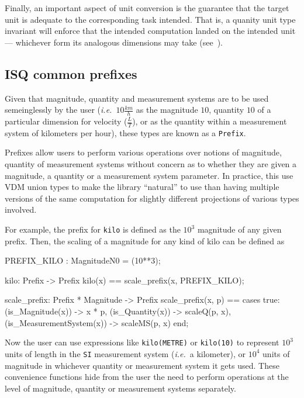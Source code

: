 \documentclass[runningheads,a4paper]{llncs}
\begin{document}
Finally, an important aspect of unit conversion is the guarantee that the target unit is adequate to the corresponding task intended. That is, a quanity unit type invariant will enforce that the intended computation landed on the intended unit --- whichever form its analogous dimensions may take (see~). 

\subsection*{ISQ common prefixes}

Given that magnitude, quantity and measurement systems are to be used semeinglessly by the user (\textit{i.e.}~\(10\frac{km}{h}\) as the magnitude \(10\), quantity \(10\) of a particular dimension for velocity (\(\frac{L}{T}\)), or as the quantity within a measurement system of kilometers per hour), these types are known as a \texttt{Prefix}. 

Prefixes allow users to perform various operations over notions of magnitude, quantity of measurement systems without concern as to whether they are given a magnitude, a quantity or a measurement system parameter. In practice, this use VDM union types to make the library ``natural'' to use than having multiple versions of the same computation for slightly different projections of various types involved. 

For example, the prefix for \texttt{kilo} is defined as the \(10^3\) magnitude of any given prefix. Then, the scaling of a magnitude for any kind of kilo can be defined as
%
\begin{vdmsl}[frame=none,basicstyle=\ttfamily\scriptsize]
    PREFIX_KILO   : MagnitudeN0 = (10**3);

    kilo: Prefix -> Prefix
    kilo(x) == scale_prefix(x, PREFIX_KILO);

    scale_prefix: Prefix * Magnitude -> Prefix
    scale_prefix(x, p) == 
        cases true:
            (is_Magnitude(x))         -> x * p,
            (is_Quantity(x))          -> scaleQ(p, x),
            (is_MeasurementSystem(x)) -> scaleMS(p, x)
        end;
\end{vdmsl}
%
\noindent Now the user can use expressions like \texttt{kilo(METRE)} or \texttt{kilo(10)} to represent \(10^3\) units of length in the \texttt{SI} measurement system (\textit{i.e.}~a kilometer), or \(10^4\) units of magnitude in whichever quantity or measurement system it gets used. These convenience functions hide from the user the need to perform operations at the level of magnitude, quantity or measurement systems separately. 
\end{document}
